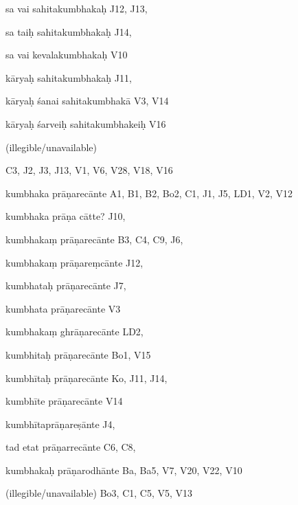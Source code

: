 \begin{ekdosis}
\begin{marma}[hp01_055]
\begin{marma}[hp02_009]
\begin{marma}[hp02_011]
\begin{marma}[hp02_73a]
\begin{description}
        \end{description}
      \end{marma}


      \begin{marma}[hp02_73b]
      \item[sa vai sahitakumbhakaḥ] J12, J13, 
      \item[sa taiḥ sahitakumbhakaḥ] J14,
      \item[sa vai kevalakumbhakaḥ] V10
      \item[kāryaḥ sahitakumbhakaḥ] J11,
      \item[kāryaḥ śanai sahitakumbhakā] V3, V14
      \item[kāryaḥ śarveiḥ sahitakumbhakeiḥ] V16
      \item[(illegible/unavailable)]
        \begin{description}

        \end{description}
      \end{marma}


      \begin{marma}[hp02_78a]
         C3, J2, J3, J13, V1, V6, V28, V18, V16
      \item[kumbhaka prāṇarecānte] A1, B1, B2, Bo2, C1, J1, J5, LD1, V2, V12
      \item[kumbhaka prāṇa cātte?] J10,
      \item[kumbhakaṃ prāṇarecānte] B3, C4, C9, J6, 
      \item[kumbhakaṃ prāṇareṃcānte] J12,
      \item[kumbhataḥ prāṇarecānte] J7,
      \item[kumbhata prāṇarecānte] V3
      \item[kumbhakaṃ ghrāṇarecānte] LD2, 
      \item[kumbhitaḥ prāṇarecānte] Bo1, V15
      \item[kumbhītaḥ prāṇarecānte] Ko, J11, J14, 
      \item[kumbhīte prāṇarecānte] V14
      \item[kumbhītaprāṇareṣānte] J4,
      \item[tad etat prāṇarrecānte] C6, C8, 
      \item[kumbhakaḥ prāṇarodhānte] Ba, Ba5, V7, V20, V22, V10
      \item[(illegible/unavailable)] Bo3, C1, C5, V5, V13
        \begin{description}

        \end{description}
      \end{marma}


    \end{ekdosis}
  

